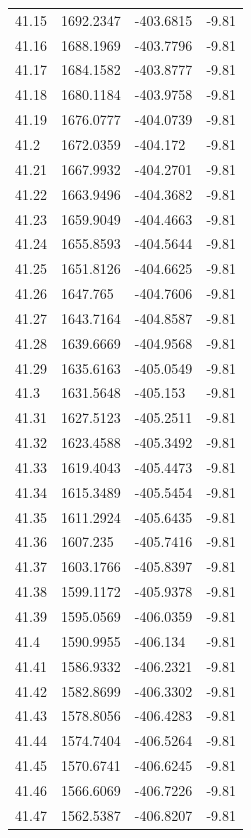 \begin{table}[H]
\begin{tabular}{llll}
41.15 & 1692.2347 & -403.6815 & -9.81 \\
41.16 & 1688.1969 & -403.7796 & -9.81 \\
41.17 & 1684.1582 & -403.8777 & -9.81 \\
41.18 & 1680.1184 & -403.9758 & -9.81 \\
41.19 & 1676.0777 & -404.0739 & -9.81 \\
41.2 & 1672.0359 & -404.172 & -9.81 \\
41.21 & 1667.9932 & -404.2701 & -9.81 \\
41.22 & 1663.9496 & -404.3682 & -9.81 \\
41.23 & 1659.9049 & -404.4663 & -9.81 \\
41.24 & 1655.8593 & -404.5644 & -9.81 \\
41.25 & 1651.8126 & -404.6625 & -9.81 \\
41.26 & 1647.765 & -404.7606 & -9.81 \\
41.27 & 1643.7164 & -404.8587 & -9.81 \\
41.28 & 1639.6669 & -404.9568 & -9.81 \\
41.29 & 1635.6163 & -405.0549 & -9.81 \\
41.3 & 1631.5648 & -405.153 & -9.81 \\
41.31 & 1627.5123 & -405.2511 & -9.81 \\
41.32 & 1623.4588 & -405.3492 & -9.81 \\
41.33 & 1619.4043 & -405.4473 & -9.81 \\
41.34 & 1615.3489 & -405.5454 & -9.81 \\
41.35 & 1611.2924 & -405.6435 & -9.81 \\
41.36 & 1607.235 & -405.7416 & -9.81 \\
41.37 & 1603.1766 & -405.8397 & -9.81 \\
41.38 & 1599.1172 & -405.9378 & -9.81 \\
41.39 & 1595.0569 & -406.0359 & -9.81 \\
41.4 & 1590.9955 & -406.134 & -9.81 \\
41.41 & 1586.9332 & -406.2321 & -9.81 \\
41.42 & 1582.8699 & -406.3302 & -9.81 \\
41.43 & 1578.8056 & -406.4283 & -9.81 \\
41.44 & 1574.7404 & -406.5264 & -9.81 \\
41.45 & 1570.6741 & -406.6245 & -9.81 \\
41.46 & 1566.6069 & -406.7226 & -9.81 \\
41.47 & 1562.5387 & -406.8207 & -9.81 \\

\end{tabular}
\end{table}
